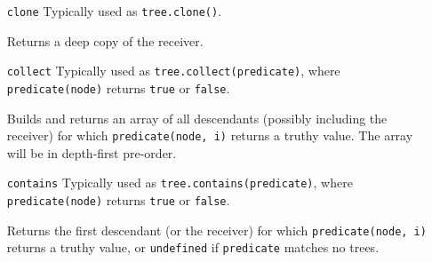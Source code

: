 \documentclass{report}
\begin{document}
\begin{enumerate}
\item[{\tt clone}]
  Typically used as {\tt tree.clone()}.

  Returns a deep copy of the receiver.

\item[{\tt collect}]
  Typically used as {\tt tree.collect(predicate)}, where {\tt predicate(node)} returns {\tt true} or {\tt false}.

  Builds and returns an array of all descendants (possibly including the receiver) for which {\tt predicate(node, i)} returns a truthy value. The array will be in depth-first pre-order.

\item[{\tt contains}]
  Typically used as {\tt tree.contains(predicate)}, where {\tt predicate(node)} returns {\tt true} or {\tt false}.

  Returns the first descendant (or the receiver) for which {\tt predicate(node, i)} returns a truthy value, or {\tt undefined} if {\tt predicate} matches no trees.
\end{enumerate}
\end{document}
